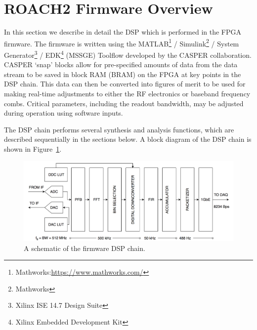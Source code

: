 \section{ROACH2 Firmware Overview}\label{firmware}

In this section we describe in detail the DSP which is performed in the FPGA firmware. The firmware is written using the MATLAB\footnote{Mathworks:\url{https://www.mathworks.com/}} / Simulink\footnote{Mathworks} / System Generator\footnote{Xilinx ISE 14.7 Design Suite} / EDK\footnote{Xilinx Embedded Development Kit} (MSSGE) Toolflow developed by the CASPER collaboration. CASPER `snap' blocks allow for pre-specified amounts of data from the data stream to be saved in block RAM (BRAM) on the FPGA at key points in the DSP chain. This data can then be converted into figures of merit to be used for making real-time adjustments to either the RF electronics or baseband frequency combs. Critical parameters, including the readout bandwidth, may be adjusted during operation using software inputs.

The DSP chain performs several synthesis and analysis functions, which are described sequentially in the sections below. A block diagram of the DSP chain is shown in Figure~\ref{fig:DSP schematic}.

\begin{figure}
\centering
\includegraphics[width=\textwidth]{figures/readout/schematics/readoutDSPschematic}
\caption{A schematic of the firmware DSP chain.}
\label{fig:DSP schematic}
\end{figure}

